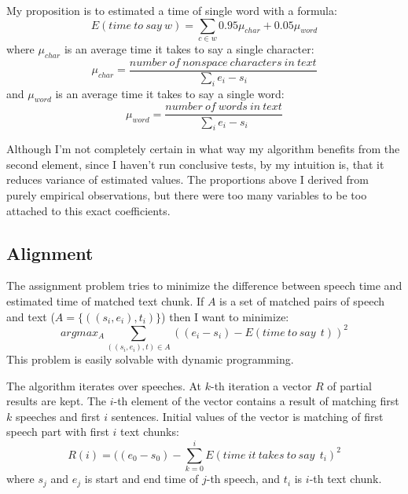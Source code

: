\documentclass[12pt,a4paper,english]{article}
\begin{document}
My proposition is to estimated a time of single word with a formula:
\begin {equation}
    E(time \: to \: say \: w) = \sum_{c \in w} 0.95 \mu_{char} + 0.05 \mu_{word}
\end {equation}
where  $\mu_{char}$ is an average time it takes to say a single character:
\begin {equation}
    \mu_{char} = \frac {number \: of \: nonspace \: characters \: in \: text} {\sum_i e_i - s_i}
\end {equation}
and $\mu_{word}$ is an average time it takes to say a single word:
\begin {equation}
    \mu_{word} = \frac {number \: of \: words \: in \: text} {\sum_i e_i - s_i}
\end {equation}
	
Although I'm not completely certain in what way my algorithm benefits from the second element,
since I haven't run conclusive tests, by my intuition is, that it reduces variance of estimated values. \newline
The proportions above I derived from purely empirical observations, but there were too many variables to be
too attached to this exact coefficients.

\newpage

\subsection{Alignment}

The assignment problem tries to minimize the difference between speech time and estimated time of matched text chunk.
If $A$ is a set of matched pairs of speech and text ($A = \{((s_i, e_i), t_i)\}$) then I want to minimize:
\begin{equation}
    argmax_A \sum_{((s_i, e_i), t) \in A} ((e_i - s_i) - E(time \: to \: say \: \: t))^2
\end{equation}
This problem is easily solvable with dynamic programming. \newline

The algorithm iterates over speeches. \newline
At $k$-th iteration a vector $R$ of partial results are kept. The $i$-th element of the vector contains a result of matching first $k$ speeches and first $i$ sentences. \newline
Initial values of the vector is matching of first speech part with first $i$ text chunks:
\begin{equation}
    R(i) = ((e_0 - s_0) - \sum_{k = 0}^i E(time \: it \: takes \: to \: say \: \: t_i)^2
\end{equation}
where $s_j$ and $e_j$ is start and end time of $j$-th speech, \newline
and $t_i$ is $i$-th text chunk. \newline
               
\end{document}
